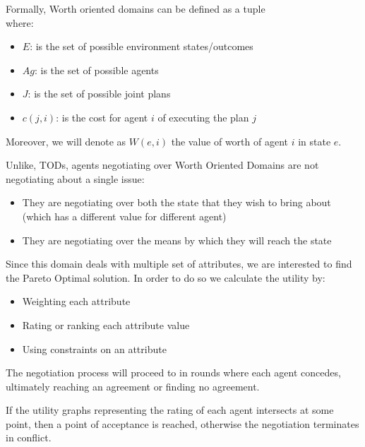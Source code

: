 Formally, Worth oriented domains can be defined as a tuple
\[<E, Ag, J, c>\]
where:
\begin{itemize}
\item $E$: is the set of possible environment states/outcomes
\item $Ag$: is the set of possible agents
\item $J$: is the set of possible joint plans
\item $c(j,i)$: is the cost for agent $i$ of executing the plan $j$
\end{itemize}
Moreover, we will denote as $W(e,i)$ the value of worth of agent $i$ in state $e$.

Unlike, TODs, agents negotiating over Worth Oriented Domains are not negotiating about a single issue:
\begin{itemize}
\item They are negotiating over both the state that they wish to bring about (which has a different value for different agent)
\item They are negotiating over the means by which they will reach the state
\end{itemize}

Since this domain deals with multiple set of attributes, we are interested to find the Pareto Optimal solution. In order to do so we calculate the utility by:
\begin{itemize}
\item Weighting each attribute
\item Rating or ranking each attribute value
\item Using constraints on an attribute
\end{itemize}

The negotiation process will proceed to in rounds where each agent concedes, ultimately reaching an agreement or finding no agreement.

If the utility graphs representing the rating of each agent intersects at some point, then a point of acceptance is reached, otherwise the negotiation terminates in conflict.

